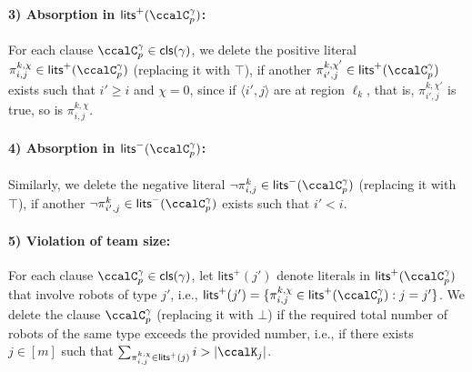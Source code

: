 \documentclass[Afour,sageh,times]{sagej}
\newcommand{\clause}[1]{\mathsf{cls}(#1)}
\newcommand{\cp}[2]{\ccalC_{#1}^{#2}}
\newcommand{\ag}[2]{\langle#1,#2\rangle}
\renewcommand{\ap}[3]{\mathcal{\pi}_{{#1},{#2}}^{#3}}
\begin{document}
{ \paragraph{3) Absorption in $\mathsf{lits}^+(\cp{p}{\gamma})$:} \label{prune:1} For each clause $\cp{p}{\gamma} \in \clause{\gamma}$, we delete the positive literal $\ap{i}{j}{k,\chi} \in \mathsf{lits}^+(\cp{p}{\gamma})$ (replacing it with $\top$), if another $\ap{i'}{j}{k,\chi'} \in \mathsf{lits}^+(\cp{p}{\gamma})$ exists such that $i' \geq i$ and $\chi=0$, since if $\ag{i'}{j}$ are at region $\ell_k$, that is, $\ap{i'}{j}{k,\chi'}$ is true, so is  $\ap{i}{j}{k,\chi}$.%
 \paragraph{4) Absorption in $\mathsf{lits}^-(\cp{p}{\gamma})$:} \label{prune:1} Similarly, we delete the negative literal $\neg \ap{i}{j}{k} \in \mathsf{lits}^-(\cp{p}{\gamma})$ (replacing it with $\top$), if another $\neg \ap{i'}{j}{k} \in \mathsf{lits}^-(\cp{p}{\gamma})$ exists such that $i' < i$.
       \paragraph{5) Violation of team size:} \label{prune:2}  For each clause $\cp{p}{\gamma} \in \clause{\gamma}$, let $\mathsf{lits}^+(j')$ denote literals in $\mathsf{lits}^+(\cp{p}{\gamma})$ that involve robots of type $j'$, i.e., $\mathsf{lits}^+(j') = \{\ap{i}{j}{k,\chi} \in \mathsf{lits}^+(\ccalC_p^\gamma): j = j'\}$. We delete the clause $\cp{p}{\gamma}$ (replacing it with $\bot$) if the required total number of robots of the same type exceeds the provided number, i.e., if there exists $j\in[m]$ such that $ \sum_{\ap{i}{j}{k,\chi}\in\mathsf{lits}^+(j)}   i > |\ccalK_{j}|$.
}
\end{document}
